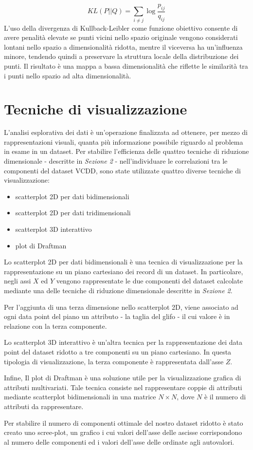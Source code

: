 \documentclass[11pt,a4paper,twocolumn]{article}
\begin{document}
\begin{equation}
\nonumber
KL(P\lvert \lvert Q)=\sum_{i \neq j}{\log{\frac{p_{ij}}{q_{ij}}}}
\end{equation}
L'uso della divergenza di Kullback-Leibler come funzione obiettivo consente di avere penalità elevate se punti vicini nello spazio originale  vengono considerati lontani nello spazio a dimensionalità ridotta, mentre il viceversa ha un'influenza minore, tendendo quindi a preservare la struttura locale della distribuzione dei punti. Il risultato è una mappa a bassa dimensionalità che riflette le similarità tra i punti nello spazio ad alta dimensionalità.
\section{Tecniche di visualizzazione}
	L'analisi esplorativa dei dati è un'operazione finalizzata ad ottenere, per mezzo di rappresentazioni visuali, quanta più informazione possibile riguardo al problema in esame in un dataset.
	Per stabilire l'efficienza delle quattro tecniche di riduzione dimensionale - descritte in \emph{Sezione 2} - nell'individuare le correlazioni tra le componenti del dataset VCDD, sono state utilizzate quattro diverse tecniche di visualizzazione:

	\begin{itemize}
		\item scatterplot 2D per dati bidimensionali
		\item scatterplot 2D per dati tridimensionali
		\item scatterplot 3D interattivo
		\item plot di Draftman
	\end{itemize}

	Lo scatterplot 2D per dati bidimensionali è una tecnica di visualizzazione per la rappresentazione su un piano cartesiano dei record di un dataset. In particolare, negli assi $X$ ed $Y$ vengono rappresentate le due componenti del dataset calcolate mediante una delle tecniche di riduzione dimensionale descritte in \emph{Sezione 2}. \par
	Per l'aggiunta di una terza dimensione nello scatterplot 2D, viene associato ad ogni data point del piano un attributo - la taglia del glifo - il cui valore è in relazione con la terza componente. \par
	Lo scatterplot 3D interattivo è un'altra tecnica per la rappresentazione dei data point del dataset ridotto a tre componenti su un piano cartesiano. In questa tipologia di visualizzazione, la terza componente è rappresentata dall'asse $ Z $. \par
	Infine, Il plot di Draftman è una soluzione utile per la visualizzazione grafica di attributi multivariati. Tale tecnica consiste nel rappresentare coppie di attributi mediante scatterplot bidimensionali in una matrice $ N \times N $, dove $ N $ è il numero di attributi da rappresentare. \par
	Per stabilire il numero di componenti ottimale del nostro dataset ridotto è stato creato uno scree-plot, un grafico i cui valori dell'asse delle ascisse corrispondono al numero delle componenti ed i valori dell'asse delle ordinate agli autovalori.
\end{document}
